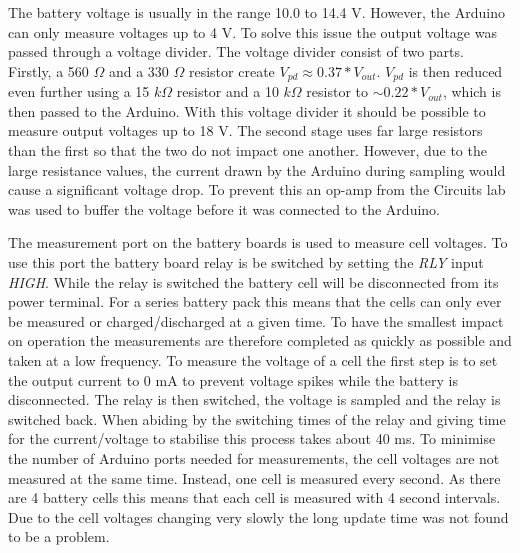 \documentclass[a4paper]{article}
\begin{document}
The battery voltage is usually in the range 10.0 to 14.4 V. However, 
the Arduino can only measure voltages up to 4 V. To solve this issue 
the output voltage was passed through a voltage divider. The voltage 
divider consist of two parts. Firstly, a 560 $\Omega$ and a 330 $\Omega$ 
resistor create $V_{pd} \approx 0.37 * V_{out}$. $V_{pd}$ is then reduced 
even further using a 15 $k\Omega$ resistor and a 10 $k\Omega$ resistor 
to $\sim 0.22 *V_{out}$, which is then passed to the Arduino. With this 
voltage divider it should be possible to measure output voltages up to 
18 V. The second stage uses far large resistors than the first so that 
the two do not impact one another. However, due to the large resistance 
values, the current drawn by the Arduino during sampling would cause a 
significant voltage drop. To prevent this an op-amp from the Circuits lab 
was used to buffer the voltage before it was connected to the Arduino.

The measurement port on the battery boards is used to measure cell voltages. 
To use this port the battery board relay is be switched by setting 
the \emph{RLY} input \emph{HIGH}. While the relay is switched the battery 
cell will be disconnected from its power terminal. For a series battery 
pack this means that the cells can only ever be measured or 
charged/discharged at a given time. To have the smallest impact on 
operation the measurements are therefore completed as quickly as possible 
and taken at a low frequency. To measure the voltage of a cell the first 
step is to set the output current to 0 mA to prevent voltage spikes 
while the battery is disconnected. The relay is then switched, the 
voltage is sampled and the relay is switched back. When abiding by the 
switching times of the relay and giving time for the current/voltage to 
stabilise this process takes about 40 ms. To minimise the number of 
Arduino ports needed for measurements, the cell voltages are not measured 
at the same time. Instead, one cell is measured every second. As there 
are 4 battery cells this means that each cell is measured with 4 second 
intervals. Due to the cell voltages changing very slowly the long update 
time was not found to be a problem.
\end{document}

